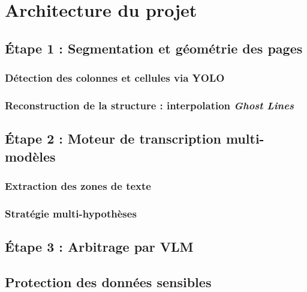 \chapter{Architecture du projet}

\section{Étape 1 : Segmentation et géométrie des pages}
\subsection{Détection des colonnes et cellules via YOLO}

\subsection{Reconstruction de la structure : interpolation \textit{Ghost Lines}}

\section{Étape 2 : Moteur de transcription multi-modèles}
\subsection{Extraction des zones de texte}

\subsection{Stratégie multi-hypothèses}

\section{Étape 3 : Arbitrage par VLM}

\section{Protection des données sensibles}

